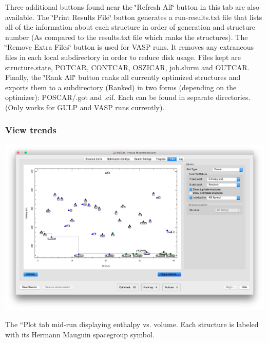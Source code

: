 Three additional buttons found near the \char`\"{}\+Refresh All\char`\"{} button in this tab are also available. The \char`\"{}\+Print Results File\char`\"{} button generates a run-\/results.\+txt file that lists all of the information about each structure in order of generation and structure number (As compared to the results.\+txt file which ranks the structures). The \char`\"{}\+Remove Extra Files\char`\"{} button is used for V\+A\+S\+P runs. It removes any extraneous files in each local subdirectory in order to reduce disk usage. Files kept are structure.\+state, P\+O\+T\+C\+A\+R, C\+O\+N\+T\+C\+A\+R, O\+S\+Z\+I\+C\+A\+R, job.\+slurm and O\+U\+T\+C\+A\+R. Finally, the \char`\"{}\+Rank All\char`\"{} button ranks all currently optimized structures and exports them to a subdirectory (Ranked) in two forms (depending on the optimizer)\+: P\+O\+S\+C\+A\+R/.got and .cif. Each can be found in separate directories. (Only works for G\+U\+L\+P and V\+A\+S\+P runs currently).\hypertarget{tut-xo_trends}{}\subsubsection{View trends}\label{tut-xo_trends}

\begin{DoxyImage}
\includegraphics[width=\textwidth]{trend-view.png}
\caption{The ``\+Plot\textquotesingle{}\textquotesingle{} tab mid-\/run displaying enthalpy vs. volume. Each structure is labeled with its Hermann Mauguin spacegroup symbol.}
\end{DoxyImage}


